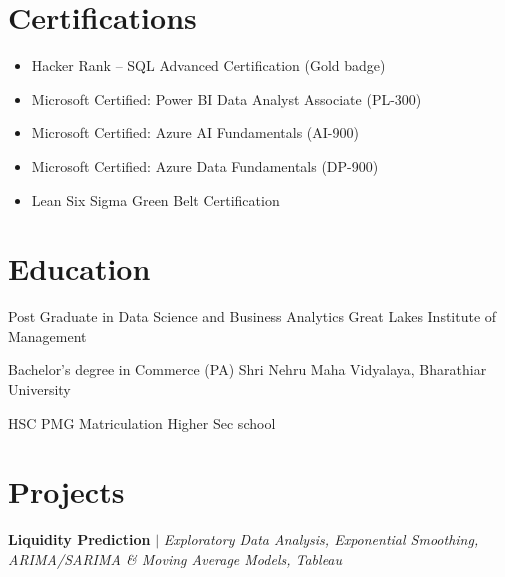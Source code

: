 \documentclass[letterpaper,11pt]{article}
\begin{document}
\resumeSubHeadingListEnd

\section{Certifications}
\begin{itemize}[leftmargin=0.35in, label=\textbullet, itemsep=0.1em]
    \item \small Hacker Rank – SQL Advanced Certification (Gold badge)
    \item \small Microsoft Certified: Power BI Data Analyst Associate (PL-300)
    \item \small Microsoft Certified: Azure AI Fundamentals (AI-900)
    \item \small Microsoft Certified: Azure Data Fundamentals (DP-900)
    \item \small Lean Six Sigma Green Belt Certification
\end{itemize}


\section{Education}
    \resumeSubHeadingListStart

    \resumeSubheading
    {Post Graduate in Data Science and Business Analytics}{}
    {Great Lakes Institute of Management}{}

    \resumeItemListStart
    \resumeItemListEnd

    \resumeSubheading
    {Bachelor’s degree in Commerce (PA)}{}
    {Shri Nehru Maha Vidyalaya, Bharathiar University}{}
    \resumeItemListStart
        {}
    \resumeItemListEnd
    
    \resumeSubheading
    {HSC}{}
    {PMG Matriculation Higher Sec school}{}
    
    \resumeSubHeadingListEnd

\section{Projects}
\resumeSubHeadingListStart

    \resumeProjectHeading
    {\textbf{Liquidity Prediction} $|$ \emph{Exploratory Data Analysis, Exponential Smoothing, ARIMA/SARIMA \& Moving Average Models, Tableau}}{}
    \resumeItemListStart
    \resumeItemListEnd
\end{document}

